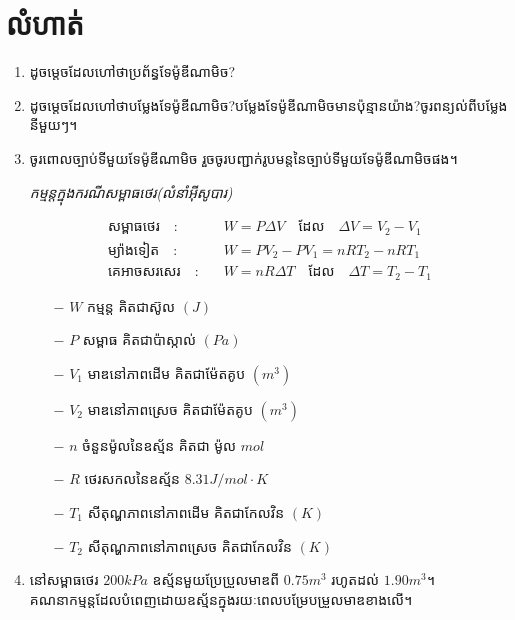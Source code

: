 \section{លំហាត់}
\begin{enumerate}[m]
		\item ដូចម្តេចដែលហៅថាប្រព័ន្ធទែម៉ូឌីណាមិច?
		\item ដូចម្តេចដែលហៅថាបម្លែងទែម៉ូឌីណាមិច?បម្លែងទែម៉ូឌីណាមិចមានប៉ុន្មានយ៉ាង?ចូរពន្យល់ពីបម្លែងនីមួយៗ។
		\item ចូរពោលច្បាប់ទីមួយទែម៉ូឌីណាមិច រួចចូរបញ្ជាក់រូបមន្តនៃច្បាប់ទីមួយទែម៉ូឌីណាមិចផង។
		\begin{formula}
			\begin{center}
				\emph{\kml កម្មន្តក្នុងករណីសម្ពាធថេរ(លំនាំអុីសូបារ)}
			\end{center}
			\begin{align*}
				\text{សម្ពាធថេរ}\quad :&\quad W=P\Delta V \quad\text{ដែល}\quad \Delta V=V_2-V_1\\
				\text{ម្យ៉ាងទៀត}\quad :&\quad W=PV_{2}-PV_{1}=nRT_{2}-nRT_{1}\\
				\text{គេអាចសរសេរ}\quad :&\quad W=nR\Delta T\quad \text{ដែល}\quad \Delta T= T_2-T_1 
			\end{align*}
			\begin{multicols}{2}
				\begin{itemize}
					\item [$-$] $W$ កម្មន្ត គិតជាស៊ូល $\left(J\right)$
					\item [$-$] $P$ សម្ពាធ គិតជាប៉ាស្កាល់ $\left(Pa\right)$
					\item [$-$] $V_{1}$ មាឌនៅភាពដើម គិតជាម៉ែតគូប $\left(m^3\right)$
					\item [$-$] $V_{2}$ មាឌនៅភាពស្រេច គិតជាម៉ែតគូប $\left(m^3\right)$
					\item [$-$] $n$ ចំនួនម៉ូលនៃឧស្ម័ន គិតជា ម៉ូល $mol$
					\item [$-$] $R$ ថេរសកលនៃឧស្ម័ន $8.31J/mol\cdot K$
					\item [$-$] $T_1$ សីតុណ្ហភាពនៅភាពដើម គិតជាកែលវិន $\left(K\right)$
					\item [$-$] $T_2$ សីតុណ្ហភាពនៅភាពស្រេច គិតជាកែលវិន $\left(K\right)$
				\end{itemize}
			\end{multicols}
		\end{formula}
		\item នៅសម្ពាធថេរ $200kPa$ ឧស្ម័នមួយប្រែប្រួលមាឌពី $0.75m^3$ រហូតដល់ $1.90m^3$។\\
		គណនាកម្មន្តដែលបំពេញដោយឧស្ម័នក្នុងរយៈពេលបម្រែបម្រួលមាឌខាងលើ។

\end{enumerate}
